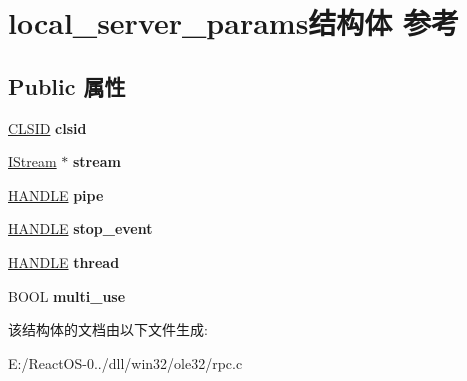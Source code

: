 \hypertarget{structlocal__server__params}{}\section{local\+\_\+server\+\_\+params结构体 参考}
\label{structlocal__server__params}
\subsection*{Public 属性}
\begin{DoxyCompactItemize}
\item 
\mbox{\label{structlocal__server__params_a815996321dd215864b5415c3e1a5f507}} 
\hyperlink{struct___i_i_d}{C\+L\+S\+ID} {\bfseries clsid}
\item 
\mbox{\label{structlocal__server__params_ab8370793337087e77057e1dfd367d545}} 
\hyperlink{interface_i_stream}{I\+Stream} $\ast$ {\bfseries stream}
\item 
\mbox{\label{structlocal__server__params_aea2fa69ffdd39debeed3a3575d167bb0}} 
\hyperlink{interfacevoid}{H\+A\+N\+D\+LE} {\bfseries pipe}
\item 
\mbox{\label{structlocal__server__params_a6a5fe3cf6fbeca447270820f1e1de6f1}} 
\hyperlink{interfacevoid}{H\+A\+N\+D\+LE} {\bfseries stop\+\_\+event}
\item 
\mbox{\label{structlocal__server__params_a4e8242d353a6ae879bc6b73aaea08c4d}} 
\hyperlink{interfacevoid}{H\+A\+N\+D\+LE} {\bfseries thread}
\item 
\mbox{\label{structlocal__server__params_a321ddba0a28c9ab03c0530499db8f54e}} 
B\+O\+OL {\bfseries multi\+\_\+use}
\end{DoxyCompactItemize}


该结构体的文档由以下文件生成\+:\begin{DoxyCompactItemize}
\item 
E\+:/\+React\+O\+S-\/0../dll/win32/ole32/rpc.\+c\end{DoxyCompactItemize}

